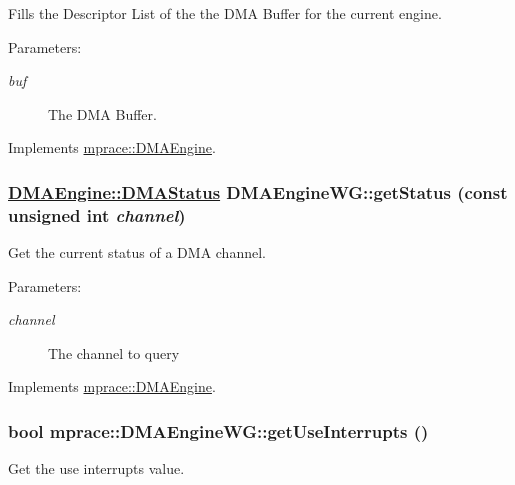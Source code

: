 Fills the Descriptor List of the the DMA Buffer for the current engine. 

\begin{Desc}
\item[Parameters:]
\begin{description}
\item[{\em buf}]The DMA Buffer.\end{description}
\end{Desc}


Implements \hyperlink{classmprace_1_1DMAEngine_a5}{mprace::DMAEngine}.\hypertarget{classmprace_1_1DMAEngineWG_a2}{
\subsubsection[getStatus]{\setlength{\rightskip}{0pt plus 5cm}\hyperlink{classmprace_1_1DMAEngine_w3}{DMAEngine::DMAStatus} DMAEngine\-WG::get\-Status (const unsigned int {\em channel})}}
\label{classmprace_1_1DMAEngineWG_a2}


Get the current status of a DMA channel. 

\begin{Desc}
\item[Parameters:]
\begin{description}
\item[{\em channel}]The channel to query\end{description}
\end{Desc}


Implements \hyperlink{classmprace_1_1DMAEngine_a1}{mprace::DMAEngine}.\hypertarget{classmprace_1_1DMAEngineWG_a9}{
\subsubsection[getUseInterrupts]{\setlength{\rightskip}{0pt plus 5cm}bool mprace::DMAEngine\-WG::get\-Use\-Interrupts ()}}
\label{classmprace_1_1DMAEngineWG_a9}


Get the use interrupts value. 


